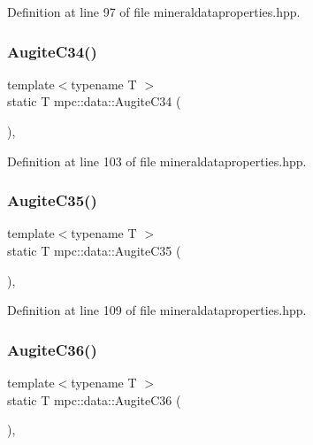 Definition at line 97 of file mineraldataproperties.\+hpp.

\mbox{\label{namespacempc_1_1data_a36d398961bf68abdca32ac0dfad83dd3}} 
\subsubsection{\texorpdfstring{Augite\+C34()}{AugiteC34()}}
{\footnotesize\ttfamily template$<$typename T $>$ \\
static T mpc\+::data\+::\+Augite\+C34 (\begin{DoxyParamCaption}{ }\end{DoxyParamCaption})\hspace{0.3cm}{\ttfamily [inline]}, {\ttfamily [static]}}



Definition at line 103 of file mineraldataproperties.\+hpp.

\mbox{\label{namespacempc_1_1data_ab3051069261729f1758f5b0cdb45965e}} 
\subsubsection{\texorpdfstring{Augite\+C35()}{AugiteC35()}}
{\footnotesize\ttfamily template$<$typename T $>$ \\
static T mpc\+::data\+::\+Augite\+C35 (\begin{DoxyParamCaption}{ }\end{DoxyParamCaption})\hspace{0.3cm}{\ttfamily [inline]}, {\ttfamily [static]}}



Definition at line 109 of file mineraldataproperties.\+hpp.

\mbox{\label{namespacempc_1_1data_a1e2cd3ace01804d86c8905f8d65bdf25}} 
\subsubsection{\texorpdfstring{Augite\+C36()}{AugiteC36()}}
{\footnotesize\ttfamily template$<$typename T $>$ \\
static T mpc\+::data\+::\+Augite\+C36 (\begin{DoxyParamCaption}{ }\end{DoxyParamCaption})\hspace{0.3cm}{\ttfamily [inline]}, {\ttfamily [static]}}



